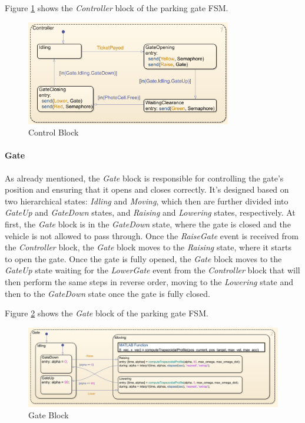 Figure \ref{fig:control_block} shows the \textit{Controller} block of the parking gate FSM.

\begin{figure}[H]
    \centering
    \includegraphics[width=0.8\textwidth]{./img/MATLAB/control_block.png}
    \caption{Control Block}
    \label{fig:control_block}
\end{figure}


\paragraph{Gate}

As already mentioned, the \textit{Gate} block is responsible for controlling the gate's position and ensuring that it opens and closes correctly.
It's designed based on two hierarchical states: \textit{Idling} and \textit{Moving}, which then are further divided into \textit{GateUp} and \textit{GateDown} states, and \textit{Raising} and \textit{Lowering} states, respectively.
At first, the \textit{Gate} block is in the \textit{GateDown} state, where the gate is closed and the vehicle is not allowed to pass through.
Once the \textit{RaiseGate} event is received from the \textit{Controller} block, the \textit{Gate} block moves to the \textit{Raising} state, where it starts to open the gate.
Once the gate is fully opened, the \textit{Gate} block moves to the \textit{GateUp} state waiting for the \textit{LowerGate} event from the \textit{Controller} block that will then perform the same steps in reverse order, moving to the \textit{Lowering} state and then to the \textit{GateDown} state once the gate is fully closed.

Figure \ref{fig:gate_block} shows the \textit{Gate} block of the parking gate FSM.

\begin{figure}[H]
    \centering
    \includegraphics[width=1.0\textwidth]{./img/MATLAB/gate_block.png}
    \caption{Gate Block}
    \label{fig:gate_block}
\end{figure}

